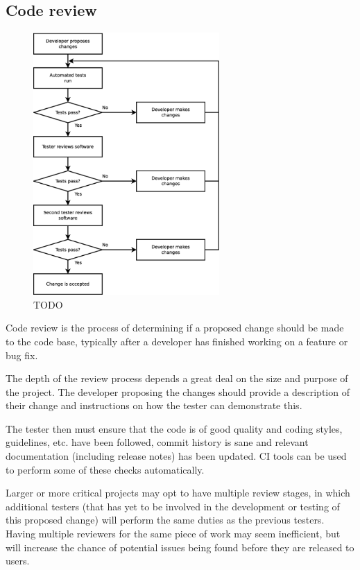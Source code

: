 \documentclass[jnr]{iosart2x}
\begin{document}
\subsection{Code review}
\label{Code review}

\begin{figure}
    \centering
    \includegraphics[height=10cm]{code_review_process.eps}
    \caption{TODO}
    \label{Code_Review_Process}
\end{figure}

Code review is the process of determining if a proposed change should be made to the code base, typically after a developer has finished working on a feature or bug fix.

The depth of the review process depends a great deal on the size and purpose of the project.
The developer proposing the changes should provide a description of their change and instructions on how the tester can demonstrate this.

The tester then must ensure that the code is of good quality and coding styles, guidelines, etc. have been followed, commit history is sane and relevant documentation (including release notes) has been updated.
CI tools can be used to perform some of these checks automatically.

Larger or more critical projects may opt to have multiple review stages, in which additional testers (that has yet to be involved in the development or testing of this proposed change) will perform the same duties as the previous testers.
Having multiple reviewers for the same piece of work may seem inefficient, but will increase the chance of potential issues being found before they are released to users.
\end{document}
